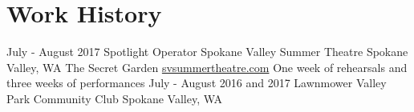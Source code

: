 \documentclass[11pt,letterpaper,sans]{moderncv}
\begin{document}
\section{Work History}
\cventry %
	{July - August 2017} %
	{Spotlight Operator}
	{Spokane Valley Summer Theatre}
	{Spokane Valley, WA}
	{The Secret Garden} %
	{ \href{https://svsummertheatre.com}{svsummertheatre.com}
		\hfill One week of rehearsals and three weeks of performances
	} %
\cventry %
	{July - August 2016 and 2017} %
	{Lawnmower}
	{Valley Park Community Club}
	{Spokane Valley, WA}
	{} %
	{} %

\clearpage

\end{document}
